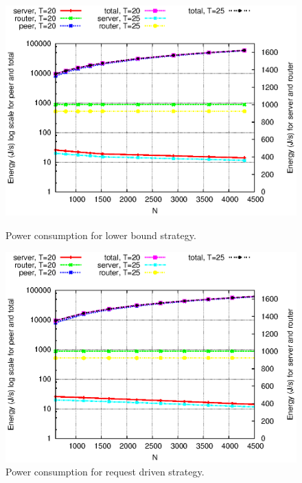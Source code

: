 \documentclass[conference]{IEEEtran}
\begin{document}
\begin{figure}[htp!]
\centering
\begin{minipage}[b]{0.4\linewidth}
	\includegraphics[scale=0.45]{graphs/lw-energy.eps}
	\caption{Power consumption for lower bound strategy.}
	\label{fig:lw-energy}
\end{minipage}
\hfill
\centering
\begin{minipage}[b]{0.4\linewidth}
	\includegraphics[scale=0.45]{graphs/req-energy.eps}
	\caption{Power consumption for request driven strategy.}
	\label{fig:req-energy}
\end{minipage}
\hfill
\centering
\begin{minipage}[b]{0.4\linewidth}

\end{minipage}
\end{figure}
\end{document}
